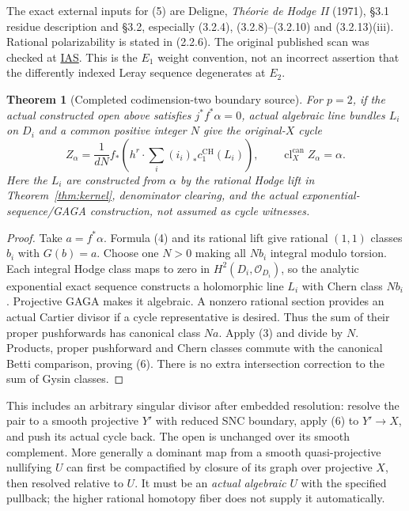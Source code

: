\documentclass[11pt]{article}
\newtheorem{theorem}{Theorem}
\newcommand{\CH}{\operatorname{CH}}
\newcommand{\cl}{\operatorname{cl}^{\mathrm{can}}}
\begin{document}
The exact external inputs for (5) are Deligne, \emph{Th\'eorie de Hodge II}
(1971), \S3.1 residue description and \S3.2, especially (3.2.4),
(3.2.8)--(3.2.10) and (3.2.13)(iii). Rational polarizability is stated
in (2.2.6). The original published scan was checked at
\href{https://publications.ias.edu/sites/default/files/Number15.pdf}{IAS}.
This is the $E_1$ weight convention, not an incorrect assertion that
the differently indexed Leray sequence degenerates at $E_2$.

\begin{theorem}[Completed codimension-two boundary source]\label{thm:cycle}
For $p=2$, if the actual constructed open above satisfies
$j^*f^*\alpha=0$, actual algebraic line bundles $L_i$ on $D_i$ and a
common positive integer $N$ give the original-$X$ cycle
\[
 \boxed{Z_\alpha=\frac1{dN}f_*\left(h^r\cdot
                  \sum_i(i_i)_*c_1^{\CH}(L_i)\right),
       \qquad\cl_X Z_\alpha=\alpha.}                    \tag{6}
\]
Here the $L_i$ are constructed from $\alpha$ by the rational Hodge
lift in Theorem~\ref{thm:kernel}, denominator clearing, and the actual
exponential-sequence/GAGA construction, not assumed as cycle witnesses.
\end{theorem}
\begin{proof}
Take $a=f^*\alpha$. Formula (4) and its rational lift give rational
$(1,1)$ classes $b_i$ with $G(b)=a$. Choose one $N>0$ making all
$Nb_i$ integral modulo torsion. Each integral Hodge class maps to zero
in $H^2(D_i,\mathcal O_{D_i})$, so the analytic exponential exact
sequence constructs a holomorphic line $L_i$ with Chern class $Nb_i$.
Projective GAGA makes it algebraic. A nonzero rational section provides
an actual Cartier divisor if a cycle representative is desired.
Thus the sum of their proper pushforwards has canonical class $Na$.
Apply (3) and divide by $N$. Products, proper pushforward and Chern
classes commute with the canonical Betti comparison, proving (6).
There is no extra intersection correction to the sum of Gysin classes.
\end{proof}
This includes an arbitrary singular divisor after embedded resolution:
resolve the pair to a smooth projective $Y'$ with reduced SNC boundary,
apply (6) to $Y'\to X$, and push its actual cycle back. The open is
unchanged over its smooth complement. More generally a dominant map
from a smooth quasi-projective nullifying $U$ can first be compactified
by closure of its graph over projective $X$, then resolved relative to $U$.
It must be an \emph{actual algebraic} $U$ with the specified pullback;
the higher rational homotopy fiber does not supply it automatically.
\end{document}
